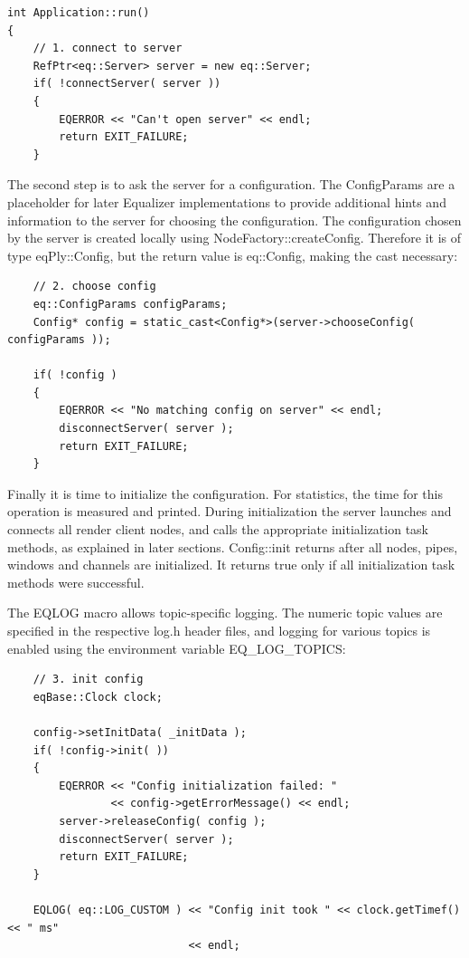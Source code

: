 \documentclass[10pt,a4]{scrartcl}
\begin{document}
{\footnotesize\begin{lstlisting}
int Application::run()
{
    // 1. connect to server
    RefPtr<eq::Server> server = new eq::Server;
    if( !connectServer( server ))
    {
        EQERROR << "Can't open server" << endl;
        return EXIT_FAILURE;
    }
\end{lstlisting}}%

The second step is to ask the server for a configuration. The
\textsf{ConfigParams} are a placeholder for later Equalizer
implementations to provide additional hints and information to the
server for choosing the configuration. The configuration chosen by the
server is created locally using
\textsf{NodeFactory::createConfig}. Therefore it is of type
\textsf{eqPly::Config}, but the return value is \textsf{eq::Config},
making the cast necessary:

{\footnotesize\begin{lstlisting}
    // 2. choose config
    eq::ConfigParams configParams;
    Config* config = static_cast<Config*>(server->chooseConfig( configParams ));

    if( !config )
    {
        EQERROR << "No matching config on server" << endl;
        disconnectServer( server );
        return EXIT_FAILURE;
    }
\end{lstlisting}}%

Finally it is time to initialize the configuration. For statistics, the
time for this operation is measured and printed. During initialization
the server launches and connects all render client nodes, and calls the
appropriate initialization task methods, as explained in later
sections. \textsf{Config::init} returns after all nodes, pipes,
windows and channels are initialized. It returns \textsf{true} only if
all initialization task methods were successful.

The \textsf{EQLOG} macro allows topic-specific logging. The numeric
topic values are specified in the respective \textsf{log.h} header
files, and logging for various topics is enabled using the environment
variable \textsf{EQ\_LOG\_TOPICS}:

{\footnotesize\begin{lstlisting}
    // 3. init config
    eqBase::Clock clock;

    config->setInitData( _initData );
    if( !config->init( ))
    {
        EQERROR << "Config initialization failed: " 
                << config->getErrorMessage() << endl;
        server->releaseConfig( config );
        disconnectServer( server );
        return EXIT_FAILURE;
    }

    EQLOG( eq::LOG_CUSTOM ) << "Config init took " << clock.getTimef() << " ms"
                            << endl;
\end{lstlisting}}%
\end{document}
